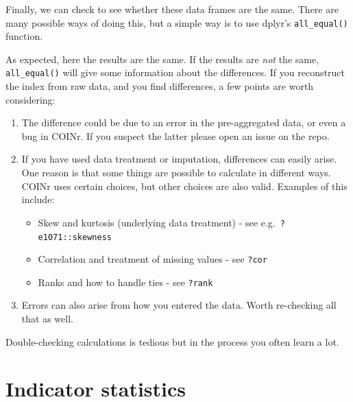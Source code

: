 \documentclass[
]{book}
\newenvironment{Shaded}{\begin{snugshade}}{\end{snugshade}}
\newcommand{\DocumentationTok}[1]{\textcolor[rgb]{0.56,0.35,0.01}{\textbf{\textit{#1}}}}
\newcommand{\FunctionTok}[1]{\textcolor[rgb]{0.00,0.00,0.00}{#1}}
\newcommand{\NormalTok}[1]{#1}
\newcommand{\SpecialCharTok}[1]{\textcolor[rgb]{0.00,0.00,0.00}{#1}}
\providecommand{\tightlist}{%
  \setlength{\itemsep}{0pt}\setlength{\parskip}{0pt}}
\begin{document}
Finally, we can check to see whether these data frames are the same. There are many possible ways of doing this, but a simple way is to use dplyr's \texttt{all\_equal()} function.

\begin{Shaded}
\end{Shaded}

As expected, here the results are the same. If the results are \emph{not} the same, \texttt{all\_equal()} will give some information about the differences. If you reconstruct the index from raw data, and you find differences, a few points are worth considering:

\begin{enumerate}
\def\labelenumi{\arabic{enumi}.}
\tightlist
\item
  The difference could be due to an error in the pre-aggregated data, or even a bug in COINr. If you suspect the latter please open an issue on the repo.
\item
  If you have used data treatment or imputation, differences can easily arise. One reason is that some things are possible to calculate in different ways. COINr uses certain choices, but other choices are also valid. Examples of this include:

  \begin{itemize}
  \tightlist
  \item
    Skew and kurtosis (underlying data treatment) - see e.g.~\texttt{?e1071::skewness}
  \item
    Correlation and treatment of missing values - see \texttt{?cor}
  \item
    Ranks and how to handle ties - see \texttt{?rank}
  \end{itemize}
\item
  Errors can also arise from how you entered the data. Worth re-checking all that as well.
\end{enumerate}

Double-checking calculations is tedious but in the process you often learn a lot.

\hypertarget{indicator-statistics}{%
\section{Indicator statistics}\label{indicator-statistics}}
\end{document}
